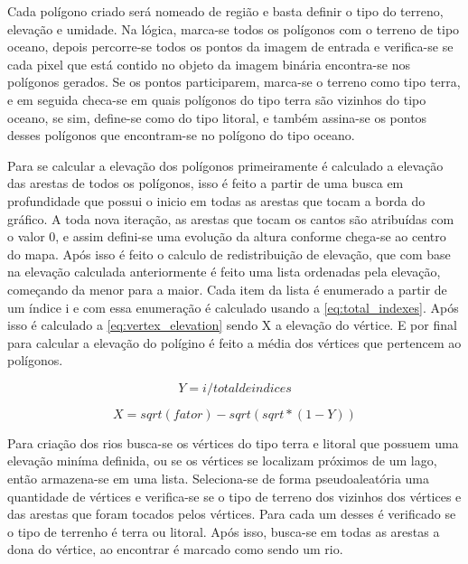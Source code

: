 Cada polígono criado será nomeado de região e basta definir o tipo do terreno, elevação e umidade. Na lógica, marca-se todos os polígonos com o terreno de tipo oceano, depois percorre-se todos os pontos da imagem de entrada e verifica-se se cada pixel que está contido no objeto da imagem binária encontra-se nos polígonos gerados. Se os pontos participarem, marca-se o terreno como tipo terra, e em seguida checa-se em quais polígonos do tipo terra são vizinhos do tipo oceano, se sim, define-se como do tipo litoral, e também assina-se os pontos desses polígonos que encontram-se no polígono do tipo oceano.

Para se calcular a elevação dos polígonos primeiramente é calculado a elevação das arestas de todos os polígonos, isso é feito a partir de uma busca em profundidade que possui o inicio em todas as arestas que tocam a borda do gráfico. A toda nova iteração, as arestas que tocam os cantos são atribuídas com o valor 0, e assim defini-se uma evolução da altura conforme chega-se ao centro do mapa.
Após isso é feito o calculo de redistribuição de elevação, que com base na elevação calculada anteriormente é feito uma lista ordenadas pela elevação, começando da menor para a maior. Cada item da lista é enumerado a partir de um índice i e com essa enumeração é calculado usando a \cref{eq:total_indexes}. Após isso é calculado a \cref{eq:vertex_elevation} sendo X a elevação do vértice.
E por final para calcular a elevação do polígino é feito a média dos vértices que pertencem ao polígonos.

\begin{equation}
	\label{eq:total_indexes}
	Y = i / total de indices
\end{equation}

\begin{equation}
	\label{eq:vertex_elevation}
	X = sqrt(fator) - sqrt(sqrt * (1 - Y))
\end{equation}

Para criação dos rios busca-se os vértices do tipo terra e litoral que possuem uma elevação miníma definida, ou se os vértices se localizam próximos de um lago, então armazena-se em uma lista. Seleciona-se de forma pseudoaleatória uma quantidade de vértices e verifica-se se o tipo de terreno dos vizinhos dos vértices e das arestas que foram tocados pelos vértices. Para cada um desses é verificado se o tipo de terrenho é terra ou litoral. Após isso, busca-se em todas as arestas a dona do vértice, ao encontrar é marcado como sendo um rio.

